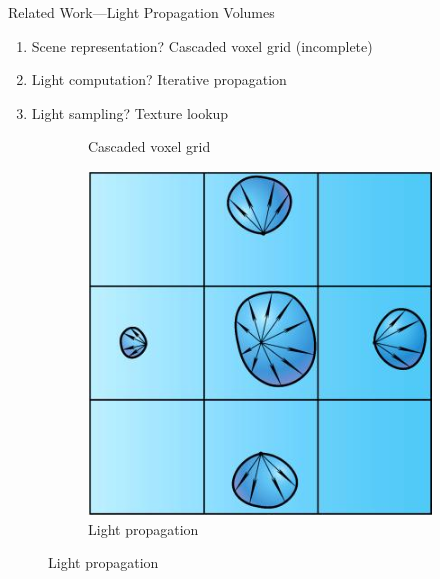 \documentclass[10pt]{beamer}
\begin{document}
{
\begin{frame}{Related Work---Light Propagation Volumes}
  \begin{enumerate}
    \item Scene representation? \alert{Cascaded voxel grid (incomplete)}%
    \item Light computation? \alert{Iterative propagation} %
    \item Light sampling? \alert{Texture lookup} %
  \end{enumerate}

  \begin{figure}
    \centering
    \begin{subfigure}[t]{0.475\textwidth}
      \caption*{Cascaded voxel grid}
    \end{subfigure}
    \begin{subfigure}[t]{0.475\textwidth}
      \includegraphics[height=0.5\textheight]{lpvpropagation}
      \caption*{Light propagation}
    \end{subfigure}
  \end{figure}


\end{frame}}
\end{document}

